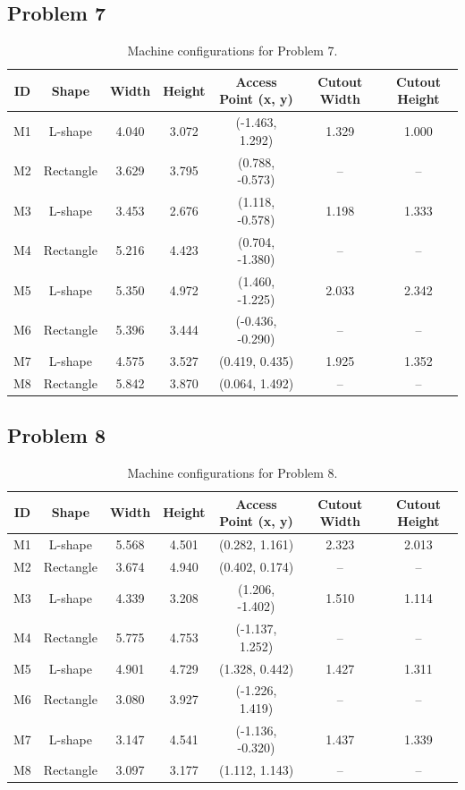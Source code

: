 \subsection{Problem 7}
\begin{table}[H]
\centering
\small
\begin{tabular}{ccccccc}
\toprule
\textbf{ID} & \textbf{Shape} & \textbf{Width} & \textbf{Height} & \textbf{Access Point (x, y)} & \textbf{Cutout Width} & \textbf{Cutout Height} \\
\midrule
M1 & L-shape   & 4.040 & 3.072 & (-1.463, 1.292)  & 1.329 & 1.000 \\
M2 & Rectangle & 3.629 & 3.795 & (0.788, -0.573)  & --    & --    \\
M3 & L-shape   & 3.453 & 2.676 & (1.118, -0.578)  & 1.198 & 1.333 \\
M4 & Rectangle & 5.216 & 4.423 & (0.704, -1.380)  & --    & --    \\
M5 & L-shape   & 5.350 & 4.972 & (1.460, -1.225)  & 2.033 & 2.342 \\
M6 & Rectangle & 5.396 & 3.444 & (-0.436, -0.290) & --    & --    \\
M7 & L-shape   & 4.575 & 3.527 & (0.419, 0.435)   & 1.925 & 1.352 \\
M8 & Rectangle & 5.842 & 3.870 & (0.064, 1.492)   & --    & --    \\
\bottomrule
\end{tabular}
\caption{Machine configurations for Problem 7.}
\end{table}

\subsection{Problem 8}
\begin{table}[H]
\centering
\small
\begin{tabular}{ccccccc}
\toprule
\textbf{ID} & \textbf{Shape} & \textbf{Width} & \textbf{Height} & \textbf{Access Point (x, y)} & \textbf{Cutout Width} & \textbf{Cutout Height} \\
\midrule
M1 & L-shape   & 5.568 & 4.501 & (0.282, 1.161)   & 2.323 & 2.013 \\
M2 & Rectangle & 3.674 & 4.940 & (0.402, 0.174)   & --    & --    \\
M3 & L-shape   & 4.339 & 3.208 & (1.206, -1.402)  & 1.510 & 1.114 \\
M4 & Rectangle & 5.775 & 4.753 & (-1.137, 1.252)  & --    & --    \\
M5 & L-shape   & 4.901 & 4.729 & (1.328, 0.442)   & 1.427 & 1.311 \\
M6 & Rectangle & 3.080 & 3.927 & (-1.226, 1.419)  & --    & --    \\
M7 & L-shape   & 3.147 & 4.541 & (-1.136, -0.320) & 1.437 & 1.339 \\
M8 & Rectangle & 3.097 & 3.177 & (1.112, 1.143)   & --    & --    \\
\bottomrule
\end{tabular}
\caption{Machine configurations for Problem 8.}
\end{table}

